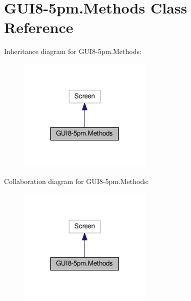 \hypertarget{classGUI8-5pm_1_1Methods}{}\section{G\+U\+I8-\/5pm.Methods Class Reference}
\label{classGUI8-5pm_1_1Methods}


Inheritance diagram for G\+U\+I8-\/5pm.Methods\+:
\nopagebreak
\begin{figure}[H]
\begin{center}
\leavevmode
\includegraphics[width=182pt]{classGUI8-5pm_1_1Methods__inherit__graph}
\end{center}
\end{figure}


Collaboration diagram for G\+U\+I8-\/5pm.Methods\+:
\nopagebreak
\begin{figure}[H]
\begin{center}
\leavevmode
\includegraphics[width=182pt]{classGUI8-5pm_1_1Methods__coll__graph}
\end{center}
\end{figure}
